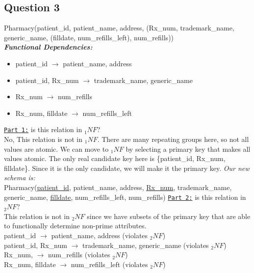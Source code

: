 \documentclass[letterpaper, 11pt]{article}
\newcommand{\1}{\mathds{1}}	%
\theoremstyle{definition}
\begin{document}
\subsection*{Question 3}
\begin{mdframed}
Pharmacy(patient\_id, patient\_name, address, (Rx\_num, trademark\_name, generic\_name, (filldate, num\_refills\_left), num\_refills)) \vspace{1.5mm}\\
\textit{\textbf{Functional Dependencies:}}
\begin{itemize}
    \item[\ding{228}] patient\_id $\rightarrow$ patient\_name, address
    \item[\ding{228}] patient\_id, Rx\_num $\rightarrow$ trademark\_name, generic\_name
        \item[\ding{228}] Rx\_num $\rightarrow$ num\_refills
        \item[\ding{228}] Rx\_num, filldate $\rightarrow$ num\_refills\_left
\end{itemize}
\end{mdframed}
\underline{\texttt{Part 1:}} is this relation in $_1NF$? \\
No, This relation is not in $_1NF$. There are many repeating groups here, so not all values are atomic. We can move to $_1NF$ by selecting a primary key that makes all values atomic.
\bigbreak \noindent
The only real candidate key here is \{patient\_id, Rx\_num, filldate\}. Since it is the only candidate, we will make it the primary key. 
\bigbreak \noindent
\textit{Our new schema is:} \vspace{2mm}\\
Pharmacy(\underline{patient\_id}, patient\_name, address, \underline{Rx\_num}, trademark\_name, generic\_name, \underline{filldate}, num\_refills\_left, num\_refills)
\bigbreak \noindent
\underline{\texttt{Part 2:}} is this relation in $_2NF$? \\
This relation is not in $_2NF$ since we have subsets of the primary key that are able to functionally determine non-prime attributes.  \vspace{2mm} \\
patient\_id $\rightarrow$ patient\_name, address (violates $_2NF$) \\ 
patient\_id, Rx\_num $\rightarrow$ trademark\_name, generic\_name (violates $_2NF$) \\
Rx\_num, $\rightarrow$ num\_refills (violates $_2NF$) \\
Rx\_num, filldate $\rightarrow$ num\_refills\_left (violates $_2NF$)
\end{document}
